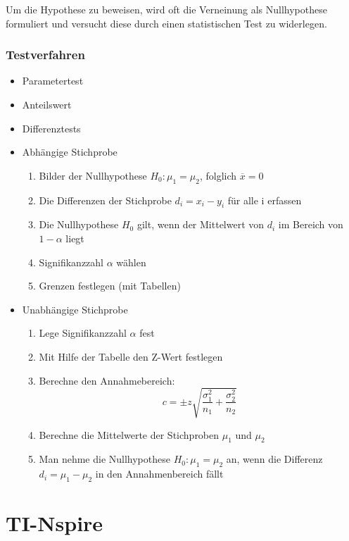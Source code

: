 \documentclass[11pt,twoside,landscape]{article}
\begin{document}
\begin{multicols}{3}
Um die Hypothese zu beweisen, wird oft die Verneinung als Nullhypothese formuliert und versucht diese durch einen statistischen Test zu widerlegen.

\subsubsection*{Testverfahren}
\label{sec:org0c1253f}
\begin{itemize}
\item Parametertest
\item Anteilswert
\item Differenztests
\end{itemize}
\begin{itemize}
\item Abhängige Stichprobe
\label{sec:org7bbdd6c}
\begin{enumerate}
\item Bilder der Nullhypothese \(H_0: \mu_1 = \mu_2\), folglich \(\overline{x} = 0\)
\item Die Differenzen der Stichprobe \(d_i = x_i - y_i\) für alle i erfassen
\item Die Nullhypothese \(H_0\) gilt, wenn der Mittelwert von \(d_i\) im Bereich von \(1-\alpha\) liegt
\item Signifikanzzahl \(\alpha\) wählen
\item Grenzen festlegen (mit Tabellen)
\end{enumerate}
\item Unabhängige Stichprobe
\label{sec:org10b23e0}
\begin{enumerate}
\item Lege Signifikanzzahl \(\alpha\) fest
\item Mit Hilfe der Tabelle den Z-Wert festlegen
\item Berechne den Annahmebereich:
\begin{equation*}
  c = \pm z \sqrt{\frac{\sigma_1^2}{n_1}+\frac{\sigma_2^2}{n_2}}
\end{equation*}

\item Berechne die Mittelwerte der Stichproben \(\mu_1\) und \(\mu_2\)
\item Man nehme die Nullhypothese \(H_0: \mu_1 = \mu_2\) an, wenn die Differenz \(d_i = \mu_1 - \mu_2\) in den Annahmenbereich fällt
\end{enumerate}
\end{itemize}


\section*{TI-Nspire}
\label{sec:org5dcbe7a}

\end{multicols}
\end{document}
